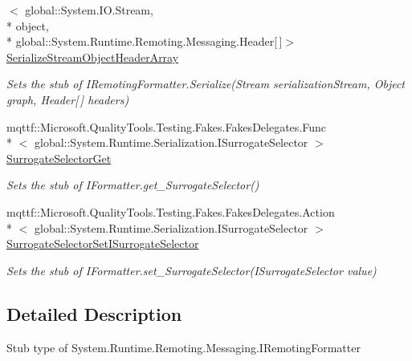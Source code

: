 \begin{DoxyCompactItemize}
$<$ global\-::\-System.\-I\-O.\-Stream, \\*
object, \\*
global\-::\-System.\-Runtime.\-Remoting.\-Messaging.\-Header\mbox{[}$\,$\mbox{]}$>$ \hyperlink{class_system_1_1_runtime_1_1_remoting_1_1_messaging_1_1_fakes_1_1_stub_i_remoting_formatter_a0386f0174caf8bb692e2b29a7c22d496}{Serialize\-Stream\-Object\-Header\-Array}
\begin{DoxyCompactList}\small\item\em Sets the stub of I\-Remoting\-Formatter.\-Serialize(\-Stream serialization\-Stream, Object graph, Header\mbox{[}$\,$\mbox{]} headers)\end{DoxyCompactList}\item 
mqttf\-::\-Microsoft.\-Quality\-Tools.\-Testing.\-Fakes.\-Fakes\-Delegates.\-Func\\*
$<$ global\-::\-System.\-Runtime.\-Serialization.\-I\-Surrogate\-Selector $>$ \hyperlink{class_system_1_1_runtime_1_1_remoting_1_1_messaging_1_1_fakes_1_1_stub_i_remoting_formatter_afbb4f2fb2d206f875f0811c0656958b3}{Surrogate\-Selector\-Get}
\begin{DoxyCompactList}\small\item\em Sets the stub of I\-Formatter.\-get\-\_\-\-Surrogate\-Selector()\end{DoxyCompactList}\item 
mqttf\-::\-Microsoft.\-Quality\-Tools.\-Testing.\-Fakes.\-Fakes\-Delegates.\-Action\\*
$<$ global\-::\-System.\-Runtime.\-Serialization.\-I\-Surrogate\-Selector $>$ \hyperlink{class_system_1_1_runtime_1_1_remoting_1_1_messaging_1_1_fakes_1_1_stub_i_remoting_formatter_a3bec58ff5b59fef29651625f59f785a3}{Surrogate\-Selector\-Set\-I\-Surrogate\-Selector}
\begin{DoxyCompactList}\small\item\em Sets the stub of I\-Formatter.\-set\-\_\-\-Surrogate\-Selector(\-I\-Surrogate\-Selector value)\end{DoxyCompactList}\end{DoxyCompactItemize}


\subsection{Detailed Description}
Stub type of System.\-Runtime.\-Remoting.\-Messaging.\-I\-Remoting\-Formatter



